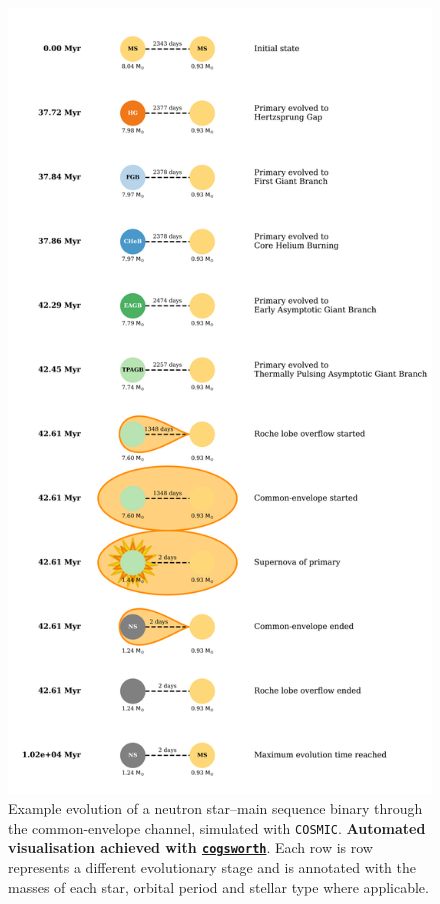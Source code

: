 \documentclass[twocolumn, twocolappendix]{aastex631}
\newcommand{\cosmic}{\texttt{COSMIC}\xspace}
\newcommand{\cogsworth}{\texttt{cogsworth}\xspace}
\begin{document}
\begin{figure}[htb]
    \centering
    \includegraphics[width=\columnwidth]{figures/cartoon.png}
    \caption{Example evolution of a neutron star--main sequence binary through the common-envelope channel, simulated with \cosmic. \textbf{Automated visualisation achieved with \href{https://cogsworth.readthedocs.io/en/latest/}{\cogsworth}}. Each row is row represents a different evolutionary stage and is annotated with the masses of each star, orbital period and stellar type where applicable.}
    \label{fig:cartoon_ms_ns}
\end{figure}
\end{document}
